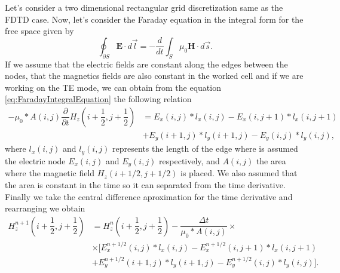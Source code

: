 \documentclass[12pt, oneside]{book}
\begin{document}
Let's consider a two dimensional rectangular grid discretization same as the FDTD case. Now, let's consider the Faraday equation in the integral form for the free space given by
\begin{equation}
    \oint_{\partial S} \boldsymbol{E} \cdot d \vec{l} = -\dfrac{d}{dt} \int_{S} \mu_0 \boldsymbol{H} \cdot d\vec{s}.
    \label{eq:FaradayIntegralEquation}
\end{equation}
If we assume that the electric fields are constant along the edges between the nodes, that the magnetics fields are also constant in the worked cell and if we are working on the TE mode, we can obtain from the equation \ref{eq:FaradayIntegralEquation} the following relation
\begin{equation}
\begin{aligned}
    -\mu_0*A(i,j)\dfrac{\partial}{\partial t} H_z\left( i + \dfrac{1}{2}, j + \dfrac{1}{2} \right) &= E_x(i,j)*l_x(i,j) - E_x(i,j+1)*l_x(i,j+1) \\
                                                                                                   &+ E_y(i+1,j)*l_y(i+1,j) - E_y(i,j)*l_y(i,j),  
\end{aligned}
\label{eq:FaradayIntegralEquationRectangularGrid}
\end{equation}
where $l_x(i,j)$ and $l_y(i,j)$ represents the length of the edge where is assumed the electric node $E_x(i,j)$ and $E_y(i,j)$ respectively, and $A(i,j)$ the area where the magnetic field $H_z (i + 1/2, j + 1/2)$ is placed. We also assumed that the area is constant in the time so it can separated from the time derivative. Finally we take the central difference aproximation for the time derivative and rearranging we obtain
\begin{equation}
    \begin{aligned}
        H_z^{n + 1}\left( i + \dfrac{1}{2}, j + \dfrac{1}{2} \right) &= H_z^{n}\left( i + \dfrac{1}{2}, j + \dfrac{1}{2} \right) - \dfrac{\Delta t}{\mu_0 * A(i,j)} \times \\
                                                                       &\times \big[ E^{n + 1/2}_x(i,j)*l_x(i,j)- E^{n + 1/2}_x(i,j+1)*l_x(i,j+1)  \\
                                                                       &+  E^{n + 1/2}_y(i+1,j)*l_y(i+1,j) - E^{n + 1/2}_y(i,j)*l_y(i,j)\big].  
    \end{aligned}
\label{eq:FaradayIntegralEquationRectangularGrid}
\end{equation}
\end{document}
